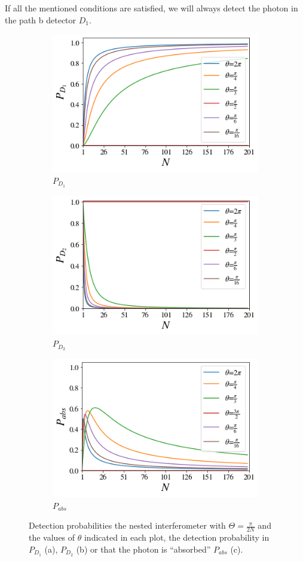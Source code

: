 \documentclass[12pt]{book}
\begin{document}
If all the mentioned conditions are satisfied, we will  always detect the photon in the path b detector $D_{1}$.

 \begin{figure}[t]
\centering
\begin{subfigure}[b]{0.45\linewidth}
\includegraphics[width=\linewidth,height=5 cm]{images/BS_Azuna.png}
\caption{$P_{D_{1}}$}
\label{fig:BS1}
\end{subfigure}
\begin{subfigure}[b]{0.45\linewidth}
\includegraphics[width=\linewidth,height=5 cm]{images/BS_AzunaD2.png}
\caption{$P_{D_{2}}$}
\label{fig:westminster_aerea}
\end{subfigure}
\begin{subfigure}[b]{0.45\linewidth}
\includegraphics[width=\linewidth,height=5 cm]{images/absorbido_azuna.png}
\caption{$P_{abs}$}
\label{fig:BS1}
\end{subfigure}
\caption{Detection probabilities the nested interferometer with $\Theta=\frac{\pi}{2N}$ and the values of $\theta$ indicated in each plot, the detection probability in $P_{D_{1}}$ (a), $P_{D_{2}}$ (b) or that the photon is ``absorbed'' $P_{abs}$ (c). }
\label{Azuma1}
\end{figure}
\end{document}
